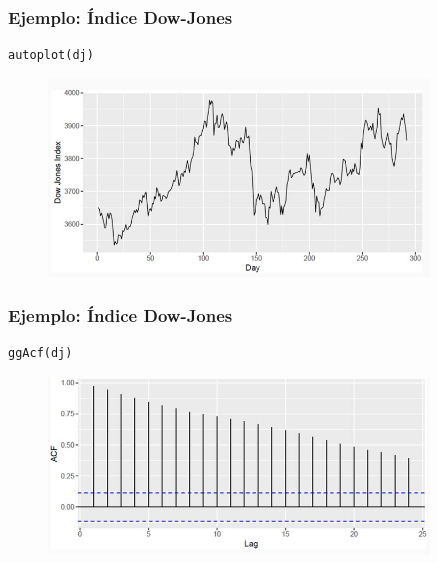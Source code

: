 \documentclass[10pt]{beamer}
\begin{document}




\begin{frame}[fragile]
\frametitle{Ejemplo: Índice Dow-Jones}


\lstset{language=r,label= ,caption= ,captionpos=b,numbers=none}
\begin{lstlisting}
autoplot(dj)
\end{lstlisting}

\pause

\begin{figure}
\begin{center}
    \includegraphics[width=0.9\textwidth]{Imagen2.JPG}
\end{center}
\end{figure}


\end{frame}







\begin{frame}[fragile]
\frametitle{Ejemplo: Índice Dow-Jones}


\lstset{language=r,label= ,caption= ,captionpos=b,numbers=none}
\begin{lstlisting}
ggAcf(dj)
\end{lstlisting}

\pause

\begin{figure}
\begin{center}
    \includegraphics[width=0.9\textwidth]{Imagen3.JPG}
\end{center}
\end{figure}


\end{frame}
\end{document}
